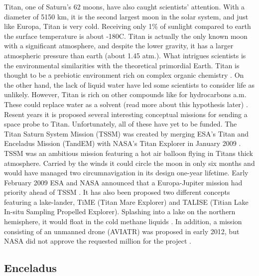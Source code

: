 Titan, one of Saturn's 62 moons, have also caught scientists' attention.
With a diameter of 5150 km, it is the second largest moon in the solar system, and just like Europa, Titan is very cold.
Receiving only 1\% of sunlight compared to earth the surface temperature is about -180\degree C.
Titan is actually the only known moon with a significant atmosphere, and despite the lower gravity, it has a larger atmospheric pressure than earth (about 1.45 atm.).
What intrigues scientists is the environmental similarities with the theoretical primordial Earth.
Titan is thought to be a prebiotic environment rich on complex organic chemistry \cite{FPlan05}. On the other hand, the lack of liquid water have led some scientists to consider life as unlikely.
However, Titan is rich on other compounds like for hydrocarbons a.m.
These could replace water as a solvent (read more about this hypothesis later) \cite{FPlan06}.
Resent years it is proposed several interesting conceptual missions for sending a space probe to Titan. Unfortunately, all of these have yet to be funded.
The Titan Saturn System Mission (TSSM) was created by merging ESA’s Titan and Enceladus Mission (TandEM) with NASA’s Titan Explorer in January 2009 \cite{FPlan10}.
TSSM was an ambitious mission featuring a hot air balloon flying in Titans thick atmosphere.
Carried by the winds it could circle the moon in only six months and would have managed two circumnavigation in its design one-year lifetime.
Early February 2009 ESA and NASA announced that a Europa-Jupiter mission had priority ahead of TSSM \cite{FPlan07}.
It has also been proposed two different concepts featuring a lake-lander, TiME (Titan Mare Explorer) and TALISE (Titian Lake In-situ Sampling Propelled Explorer).
Splashing into a lake on the northern hemisphere, it would float in the cold methane liquids \cite{FPlan05}.
In addition, a mission consisting of an unmanned drone (AVIATR) was proposed in early 2012, but NASA did not approve the requested  million for the project \cite{FPlan05}.

\subsection*{Enceladus}
 
